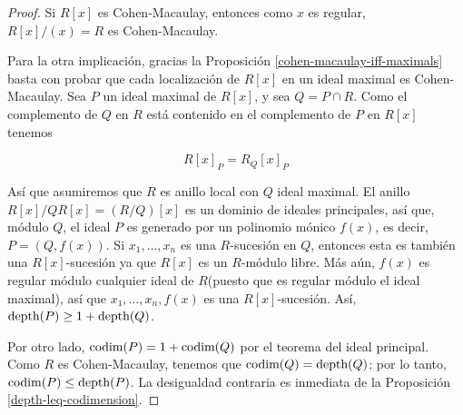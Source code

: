 \begin{proof}
Si $R[x]$ es Cohen-Macaulay, entonces como $x$ es regular, $R[x]/(x) = R$ es Cohen-Macaulay.

Para la otra implicación, gracias la Proposición \ref{cohen-macaulay-iff-maximals} basta con probar que cada localización de $R[x]$ en un ideal maximal es Cohen-Macaulay. Sea $P$ un ideal maximal de $R[x]$, y sea $Q = P\cap R$. Como el complemento de $Q$ en $R$ está contenido en el complemento de $P$ en $R[x]$ tenemos

$$ R[x]_P = R_Q[x]_P $$

Así que asumiremos que $R$ es anillo local con $Q$ ideal maximal. El anillo $R[x]/QR[x] = (R/Q)[x]$ es un dominio de ideales principales, así que, módulo $Q$, el ideal $P$ es generado por un polinomio mónico $f(x)$, es decir, $P=(Q,f(x))$. Si $x_1, \dots, x_n$ es una $R$-sucesión en $Q$, entonces esta es también una $R[x]$-sucesión ya que $R[x]$ es un $R$-módulo libre. Más aún, $f(x)$ es regular módulo cualquier ideal de $R$(puesto que es regular módulo el ideal maximal), así que $x_1,\dots,x_n,f(x)$ es una $R[x]$-sucesión. Así, $\textrm{depth}(P) \geq 1+\textrm{depth}(Q)$.

Por otro lado, $\textrm{codim}(P) = 1 + \textrm{codim}(Q)$ por el teorema del ideal principal. Como $R$ es Cohen-Macaulay, tenemos que $\textrm{codim}(Q) = \textrm{depth}(Q)$; por lo tanto, $\textrm{codim}(P) \leq \textrm{depth}(P)$. La desigualdad contraria es inmediata de la Proposición \ref{depth-leq-codimension}.
\end{proof}